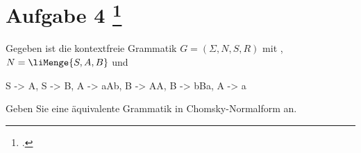 \documentclass{lehramt-informatik-aufgabe}
\begin{document}
\let\m=\liMenge

\section{Aufgabe 4
\footcite{66115:2012:03}}

Gegeben ist die kontextfreie Grammatik $G = (\Sigma, N, S, R)$ mit
, $N = \m{S, A, B}$ und

\begin{liProduktionsRegeln}
S -> A,
S -> B,
A -> aAb,
B -> AA,
B -> bBa,
A -> a
\end{liProduktionsRegeln}

Geben Sie eine äquivalente Grammatik in Chomsky-Normalform an.
\end{document}
